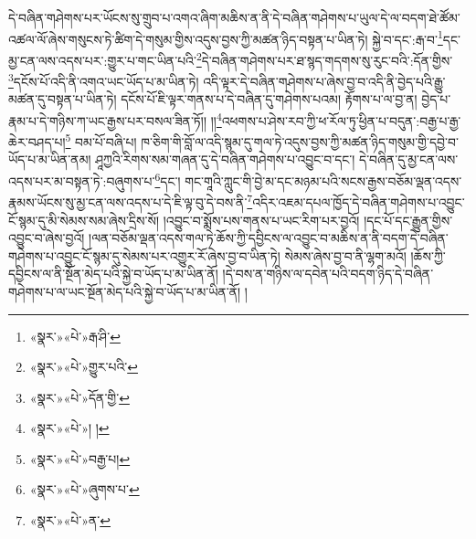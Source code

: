 དེ་བཞིན་གཤེགས་པར་ཡོངས་སུ་གྲུབ་པ་འགའ་ཞིག་མཆིས་ན་ནི་དེ་བཞིན་གཤེགས་པ་ཡུལ་དེ་ལ་བདག་ཐེ་ཚོམ་འཚལ་ལོ་ཞེས་གསུངས་ཏེ་ཚིག་དེ་གསུམ་གྱིས་འདུས་བྱས་ཀྱི་མཚན་ཉིད་བསྟན་པ་ཡིན་ཏེ། སྐྱེ་བ་དང་:རྒ་བ་\footnote{«སྣར་»«པེ་»རྒ་ཤི་}དང་མྱ་ངན་ལས་འདས་པར་:གྱུར་པ་གང་ཡིན་པའི་\footnote{«སྣར་»«པེ་»གྱུར་པའི་}དེ་བཞིན་གཤེགས་པར་ཐ་སྙད་གདགས་སུ་རུང་བའི་:དོན་གྱིས་\footnote{«སྣར་»«པེ་»དོན་གྱི་}དངོས་པོ་འདི་ནི་འགའ་ཡང་ཡོད་པ་མ་ཡིན་ཏེ། འདི་ལྟར་དེ་བཞིན་གཤེགས་པ་ཞེས་བྱ་བ་འདི་ནི་བྱེད་པའི་རྒྱུ་མཚན་དུ་བསྟན་པ་ཡིན་ཏེ། དངོས་པོ་ཇི་ལྟར་གནས་པ་དེ་བཞིན་དུ་གཤེགས་པའམ། རྟོགས་པ་ལ་བྱ་ན། བྱེད་པ་རྣམ་པ་དེ་གཉིས་ཀ་ཡང་རྒྱས་པར་བསལ་ཟིན་ཏོ།། །།\footnote{«སྣར་»«པེ་»། །}འཕགས་པ་ཤེས་རབ་ཀྱི་ཕ་རོལ་ཏུ་ཕྱིན་པ་བདུན་:བརྒྱ་པ་རྒྱ་ཆེར་བཤད་པ།\footnote{«སྣར་»«པེ་»བརྒྱ་པ།} བམ་པོ་བཞི་པ། ཁ་ཅིག་གི་བློ་ལ་འདི་སྙམ་དུ་གལ་ཏེ་འདུས་བྱས་ཀྱི་མཚན་ཉིད་གསུམ་གྱི་དབྱེ་བ་ཡོད་པ་མ་ཡིན་ནམ། ཤཱཀྱའི་རིགས་སམ་གཞན་དུ་དེ་བཞིན་གཤེགས་པ་འབྱུང་བ་དང་། དེ་བཞིན་དུ་མྱ་ངན་ལས་འདས་པར་མ་བསྟན་ཏེ་:བཞུགས་པ་\footnote{«སྣར་»«པེ་»ཞུགས་པ་}དང་། གང་གཱའི་ཀླུང་གི་བྱེ་མ་དང་མཉམ་པའི་སངས་རྒྱས་བཅོམ་ལྡན་འདས་རྣམས་ཡོངས་སུ་མྱ་ངན་ལས་འདས་པ་དེ་ཇི་ལྟ་བུ་དེ་བས་ནི་\footnote{«སྣར་»«པེ་»ན་}འདིར་འཇམ་དཔལ་ཁྱོད་དེ་བཞིན་གཤེགས་པ་འབྱུང་ངོ་སྙམ་དུ་མི་སེམས་སམ་ཞེས་དྲིས་སོ། །འབྱུང་བ་སྨོས་པས་གནས་པ་ཡང་རིག་པར་བྱའོ། །དང་པོ་དང་རྒྱུན་གྱིས་འབྱུང་བ་ཞེས་བྱའོ། །ལན་བཅོམ་ལྡན་འདས་གལ་ཏེ་ཆོས་ཀྱི་དབྱིངས་ལ་འབྱུང་བ་མཆིས་ན་ནི་བདག་དེ་བཞིན་གཤེགས་པ་འབྱུང་ངོ་སྙམ་དུ་སེམས་པར་འགྱུར་རོ་ཞེས་བྱ་བ་ཡིན་ཏེ། སེམས་ཞེས་བྱ་བ་ནི་ལྷག་མའོ། །ཆོས་ཀྱི་དབྱིངས་ལ་ནི་སྔོན་མེད་པའི་སྐྱེ་བ་ཡོད་པ་མ་ཡིན་ནོ། །དེ་བས་ན་གཉིས་ལ་དབེན་པའི་བདག་ཉིད་དེ་བཞིན་གཤེགས་པ་ལ་ཡང་སྔོན་མེད་པའི་སྐྱེ་བ་ཡོད་པ་མ་ཡིན་ནོ། །
